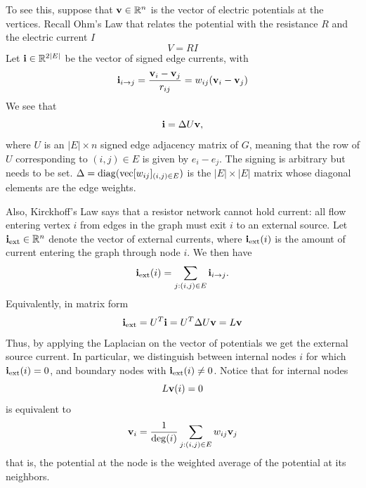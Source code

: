 To see this, suppose that $\mathbf{v} \in \mathbb{R}^n$ is the vector of electric potentials at the vertices. Recall Ohm's Law that relates the potential with the resistance $R$ and the electric current $I$
$$V = RI$$
Let $\mathbf{i} \in \mathbb{R}^{2|E|}$ be the vector of signed edge currents, with 
$$\mathbf{i}_{i \to j} = \frac{\mathbf{v}_i - \mathbf{v}_j}{r_{ij}} = w_{ij}(\mathbf{v}_i - \mathbf{v}_j)$$  
We see that
\begin{equation}
\mathbf{i} = \Delta U\mathbf{v},
\end{equation}
where $U$ is an $|E|\times n$ signed edge adjacency matrix of $G$, meaning that the row of $U$ corresponding to $(i,j)\in E$ is given by $e_i-e_j$. The signing is arbitrary but needs to be set. $\Delta=\operatorname{diag}(\mathrm{vec}[w_{ij}]_{(i,j)\in E})$ is the $|E|\times |E|$ matrix whose diagonal elements are the edge weights.

Also, Kirckhoff's Law says that a resistor network cannot hold current: all 
flow entering vertex $i$ from
edges in the graph must exit $i$ to an external source. Let $\mathbf{i}_{\text{ext}} \in \mathbb{R}^n$ denote the vector of external currents,
where $\mathbf{i}_{\text{ext}}(i)$ is the amount of current entering the graph through node $i$. We then have
\begin{equation}
\mathbf{i}_{\text{ext}}(i) = \sum_{j : (i,j)\in E} \mathbf{i}_{i\to j}.
\end{equation}
Equivalently, in matrix form
\begin{equation}
\mathbf{i}_{\text{ext}} = U^T \mathbf{i} = U^T \Delta U\mathbf{v} = L\mathbf{v}
\end{equation}
Thus, by applying the Laplacian on the vector of potentials we get the external source current. In particular, we distinguish between internal nodes $i$ for which $\mathbf{i}_{\text{ext}}(i)=0$, and boundary nodes with $\mathbf{i}_{\text{ext}}(i) \neq 0$. Notice that for internal nodes
$$L \mathbf{v}(i)=0$$
is equivalent to
$$\mathbf{v}_i = \frac{1}{\deg(i)} \sum_{j:(i,j)\in E} w_{ij} \mathbf{v}_j$$  
that is, the potential at the node is the weighted average of the potential at its neighbors.

